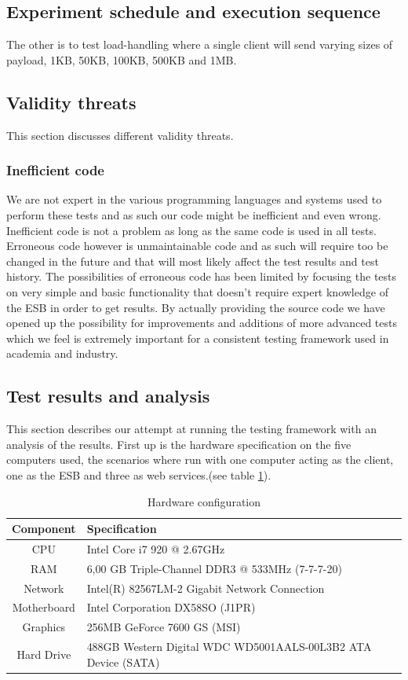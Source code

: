 \subsection{Experiment schedule and execution sequence}
The other is to test load-handling where a single client will send varying sizes of payload, 1KB, 50KB, 100KB, 500KB and 1MB.
\subsection{Validity threats}
This section discusses different validity threats.
\subsubsection{Inefficient code}
We are not expert in the various programming languages and systems used to perform these tests and as such our code might be inefficient and even wrong. Inefficient code is not a problem as long as the same code is used in all tests. Erroneous code however is unmaintainable code and as such will require too be changed in the future and that will most likely affect the test results and test history. 
The possibilities of erroneous code has been limited by focusing the tests on very simple and basic functionality that doesn't require expert knowledge of the ESB in order to get results.
By actually providing the source code we have opened up the possibility for improvements and additions of more advanced tests which we feel is extremely important for a consistent testing framework used in academia and industry.

\subsection{Test results and analysis}


This section describes our attempt at running the testing framework with an analysis of the results.
First up is the hardware specification on the five computers used, the scenarios where run with one computer acting as the client, one as the ESB and three as web services.(see table \ref{table:hw-spec}). 

\begin{table}[H]
	\caption{Hardware configuration}
	\label{table:hw-spec}
	\begin{tabular}{c l}
		Component & Specification \\ 
		\hline
		CPU & Intel Core i7 920 @ 2.67GHz  \\
		RAM &  6,00 GB Triple-Channel DDR3 @ 533MHz (7-7-7-20) \\
		Network &  Intel(R) 82567LM-2 Gigabit Network Connection \\
		Motherboard &  Intel Corporation DX58SO (J1PR) \\
		Graphics &  256MB GeForce 7600 GS (MSI) \\
		Hard Drive &  488GB Western Digital WDC WD5001AALS-00L3B2 ATA Device (SATA) \\
		\hline
	\end{tabular} 
\end{table}

